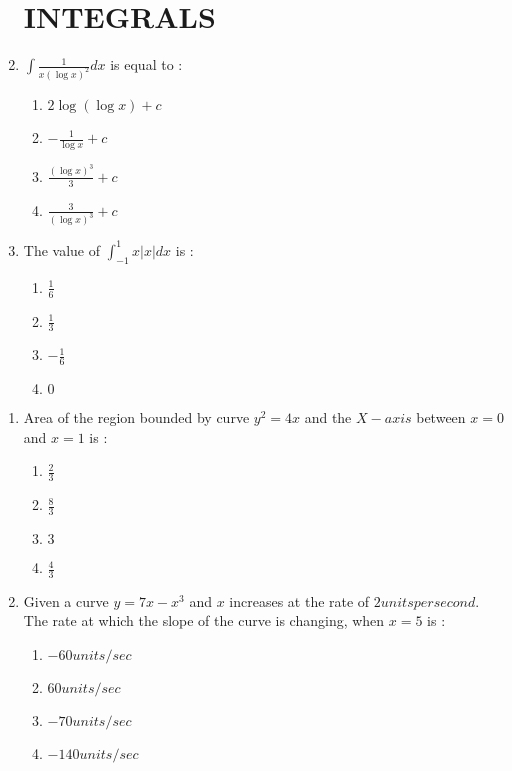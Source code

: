 \documentclass{article}
\providecommand{\brak}[1]{\ensuremath{\left(#1\right)}}
\begin{document}
\begin{enumerate}
		\section{INTEGRALS}
	\item $\int \frac{1}{x\brak{\log x}^2} dx$ is equal to :                                                                                                                                      \begin{enumerate}
			\item $2\log\brak{\log x}+c$
\item $-\frac{1}{\log x}+c$
\item $\frac{\brak{\log x}^3}{3}+c$
\item $\frac{3}{\brak{\log x}^3}+c$
        \end{enumerate}

\item The value of $\int_{-1}^{1} x|{x}| dx$ is :
                \begin{enumerate}
\item $\frac{1}{6}$
\item $\frac{1}{3}$
\item $-\frac{1}{6}$
\item $0$
        \end{enumerate}
\end{enumerate}
\begin{enumerate}
		\section{AREA AND CURVES}
\item Area of the region bounded by curve $y^2 = 4x$ and the $X-axis$ between $x = 0$ and $x = 1$ is :
	\begin{enumerate}
\item $\frac{2}{3}$
\item $\frac{8}{3}$
\item $3$
\item $\frac{4}{3}$
\end{enumerate}
                \item Given a curve $y = 7x - x^3$ and $x$ increases at the rate of $2 units	per	second$. The rate at which the slope of the curve is changing, when $x = 5$ is :
                \begin{enumerate}
                \item $-60 units/sec$                                                                                                                                                            \item $60 units/sec$
                \item $-70 units/sec$
                \item $-140 units/sec$
                \end{enumerate}
\end{enumerate}
\end{document}
